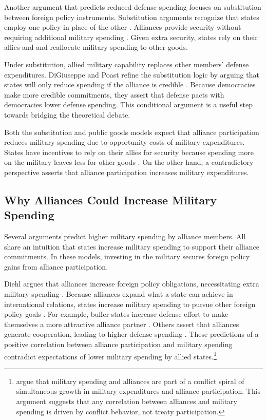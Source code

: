 \documentclass[12pt]{article}
\begin{document}
Another argument that predicts reduced defense spending focuses on substitution between foreign policy instruments.
Substitution arguments recognize that states employ one policy in place of the other \citep{MostStarr1989}.
Alliances provide security without requiring additional military spending \citep{Morrow1993, Conybeare1994}. 
Given extra security, states rely on their allies and and reallocate military spending to other goods. 


Under substitution, allied military capability replaces other members' defense expenditures. 
DiGiuseppe and Poast refine the substitution logic by arguing that states will only reduce spending if the alliance is credible \citep{DigiuseppePoast2016}.
Because democracies make more credible commitments, they assert that defense pacts with democracies lower defense spending.
This conditional argument is a useful step towards bridging the theoretical debate. 


Both the substitution and public goods models expect that alliance participation reduces military spending due to opportunity costs of military expenditures. 
States have incentives to rely on their allies for security because spending more on the military leaves less for other goods \citep{Fordham1998, Fearon2018}.
On the other hand, a contradictory perspective asserts that alliance participation increases military expenditures. 


\subsection{Why Alliances Could Increase Military Spending}


Several arguments predict higher military spending by alliance members.
All share an intuition that states increase military spending to support their alliance commitments. 
In these models, investing in the military secures foreign policy gains from alliance participation. 


Diehl argues that alliances increase foreign policy obligations, necessitating extra military spending \citep{Diehl1994}.
Because alliances expand what a state can achieve in international relations, states increase military spending to pursue other foreign policy goals \cite{MorganPalmer2006}.
For example, buffer states increase defense effort to make themselves a more attractive alliance partner \citep{Horowitzetal2017}.
Others assert that alliances generate cooperation, leading to higher defense spending \citep{Palmer1990, QuirozFlores2011}. 
These predictions of a positive correlation between alliance participation and military spending contradict expectations of lower military spending by allied states.\footnote{
\citet{SeneseVasquez2008} argue that military spending and alliances are part of a conflict spiral of simultaneous growth in military expenditures and alliance participation. 
This argument suggests that any correlation between alliances and military spending is driven by conflict behavior, not treaty participation.
}
\end{document}
